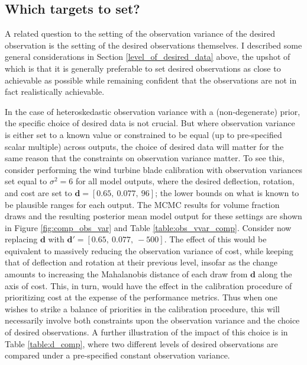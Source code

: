 \documentclass{article}
\begin{document}

\subsection{Which targets to set?}\label{which_data}

A related question to the setting of the observation variance of the desired observation is the setting of the desired observations themselves. I described some general considerations in Section \ref{level_of_desired_data} above, the upshot of which is that it is generally preferable to set desired observations as close to achievable as possible while remaining confident that the observations are not in fact realistically achievable. 

In the case of heteroskedastic observation variance with a (non-degenerate) prior, the specific choice of desired data is not crucial. But where observation variance is either set to a known value or constrained to be equal (up to pre-specified scalar multiple) across outputs, the choice of desired data will matter for the same reason that the constraints on observation variance matter. To see this, consider performing the wind turbine blade calibration with observation variances set equal to $\sigma^2=6$ for all model outputs, where the desired deflection, rotation, and cost are set to $\mathbf d=[0.65,\ 0.077,\ 96]$; the lower bounds on what is known to be plausible ranges for each output. The MCMC results for volume fraction draws and the resulting posterior mean model output for these settings are shown in Figure \ref{fig:comp_obs_var} and Table \ref{table:obs_vvar_comp}. Consider now replacing $\mathbf d$ with $\mathbf d'=[0.65,\ 0.077,\ -500]$. The effect of this would be equivalent to massively reducing the observation variance of cost, while keeping that of deflection and rotation at their previous level, insofar as the change amounts to increasing the Mahalanobis distance of each draw from $\mathbf d$ along the axis of cost. This, in turn, would have the effect in the calibration procedure of prioritizing cost at the expense of the performance metrics. Thus when one wishes to strike a balance of priorities in the calibration procedure, this will necessarily involve both constraints upon the observation variance and the choice of desired observations. A further illustration of the impact of this choice is in Table \ref{table:d_comp}, where two different levels of desired observations are compared under a pre-specified constant observation variance.
\end{document}
